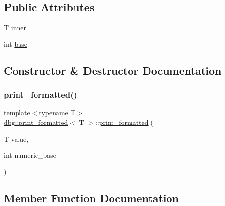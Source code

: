 \subsection*{Public Attributes}
\begin{DoxyCompactItemize}
\item 
T \hyperlink{structdbg_1_1print__formatted_a080056e4f7af0c86ed46bc2ecb9c6f1e}{inner}
\item 
int \hyperlink{structdbg_1_1print__formatted_af57ecb89743fca9b4cb1d0afd3c9d9f4}{base}
\end{DoxyCompactItemize}


\subsection{Constructor \& Destructor Documentation}
\mbox{\label{structdbg_1_1print__formatted_a77fef2b6aa871171bfefe58bab8a03fe}} 
\subsubsection{\texorpdfstring{print\+\_\+formatted()}{print\_formatted()}}
{\footnotesize\ttfamily template$<$typename T$>$ \\
\hyperlink{structdbg_1_1print__formatted}{dbg\+::print\+\_\+formatted}$<$ T $>$\+::\hyperlink{structdbg_1_1print__formatted}{print\+\_\+formatted} (\begin{DoxyParamCaption}\item[{T}]{value,  }\item[{int}]{numeric\+\_\+base }\end{DoxyParamCaption})\hspace{0.3cm}{\ttfamily [inline]}}



\subsection{Member Function Documentation}
\mbox{\label{structdbg_1_1print__formatted_ab6a7c4280acb807f5c5ab812f80a8aca}} 
